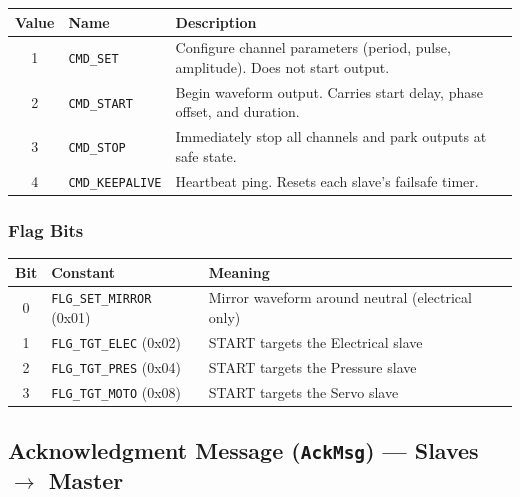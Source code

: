 \documentclass[11pt,a4paper]{article}
\begin{document}
\begin{center}
\begin{tabular}{clp{8cm}}
\toprule
\textbf{Value} & \textbf{Name} & \textbf{Description} \\
\midrule
1 & \texttt{CMD\_SET}       & Configure channel parameters (period, pulse, amplitude). Does not start output. \\
2 & \texttt{CMD\_START}     & Begin waveform output. Carries start delay, phase offset, and duration. \\
3 & \texttt{CMD\_STOP}      & Immediately stop all channels and park outputs at safe state. \\
4 & \texttt{CMD\_KEEPALIVE} & Heartbeat ping. Resets each slave's failsafe timer. \\
\bottomrule
\end{tabular}
\end{center}

\subsubsection{Flag Bits}

\begin{center}
\begin{tabular}{cll}
\toprule
\textbf{Bit} & \textbf{Constant} & \textbf{Meaning} \\
\midrule
0 & \texttt{FLG\_SET\_MIRROR} (0x01) & Mirror waveform around neutral (electrical only) \\
1 & \texttt{FLG\_TGT\_ELEC}  (0x02) & START targets the Electrical slave \\
2 & \texttt{FLG\_TGT\_PRES}  (0x04) & START targets the Pressure slave \\
3 & \texttt{FLG\_TGT\_MOTO}  (0x08) & START targets the Servo slave \\
\bottomrule
\end{tabular}
\end{center}

\subsection{Acknowledgment Message (\texttt{AckMsg}) --- Slaves $\to$ Master}
\end{document}
